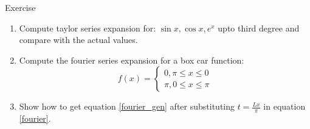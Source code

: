 \documentclass[11pt,titlepage,fleqn]{article}
\begin{document}
\begin{section}{Exercise}
\begin{enumerate}
\item Compute taylor series expansion for: $\sin x, \cos x, e^x$ upto third degree and compare with the actual values.

\item Compute the fourier series expansion for a box car function:
\begin{equation}
f(x) = \begin{cases}
0, \pi \leq x \leq 0\\
\pi , 0 \leq x \leq \pi
\end{cases}
\end{equation}

\item Show how to get equation \ref{fourier_gen} after substituting $t = \frac{Lx}{\pi}$ in equation \ref{fourier}.

\end{enumerate}

\end{section}
\end{document}
